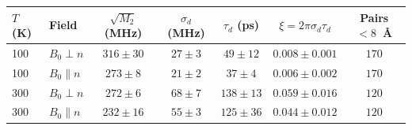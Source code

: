 \begin{tabular}{llccccc}
\toprule
$T$ (K) & Field & $\sqrt{M_2}$ (MHz) & $\sigma_d$ (MHz) & $\tau_d$ (ps) & $\xi=2\pi\sigma_d\tau_d$ & Pairs $<8$~\AA\\
\midrule
100 & $B_0\perp n$ & $316\pm30$ & $27\pm3$ & $49\pm12$ & $0.008\pm0.001$ & $170$\\
100 & $B_0\parallel n$ & $273\pm8$ & $21\pm2$ & $37\pm4$ & $0.006\pm0.002$ & $170$\\
300 & $B_0\perp n$ & $272\pm6$ & $68\pm7$ & $138\pm13$ & $0.059\pm0.016$ & $120$\\
300 & $B_0\parallel n$ & $232\pm16$ & $55\pm3$ & $125\pm36$ & $0.044\pm0.012$ & $120$\\
\bottomrule
\end{tabular}
